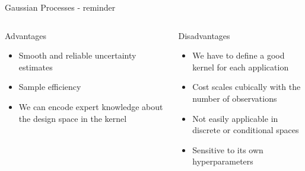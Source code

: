 \begin{frame}[c]{Gaussian Processes - reminder}

\begin{columns}[T] %
\begin{column}{.48\textwidth}

    \begin{block}{Advantages}
    \begin{itemize}
    	\item Smooth and reliable uncertainty estimates 
		\item Sample efficiency
    	\item We can encode expert knowledge about the design space in the kernel 
    \end{itemize}
    \end{block}
\end{column}%

\hfill%
\pause

\begin{column}{.48\textwidth}
    \begin{block}{Disadvantages}
    \begin{itemize}
    	\item We have to define a good kernel for each application 
    	\item Cost scales cubically with the number of observations 
    	\item Not easily applicable in discrete or conditional spaces 
    	\item Sensitive to its own hyperparameters
    \end{itemize}
\end{block}

\end{column}
\end{columns}

	

\end{frame}

